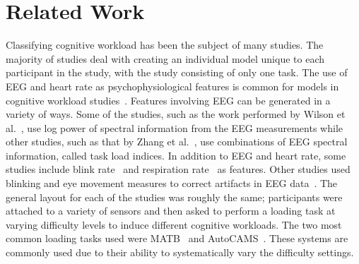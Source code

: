 \documentclass[11pt]{article}
\begin{document}
\section{Related Work}
Classifying cognitive workload has been the subject of many studies. The majority of studies deal with creating an individual model unique to each participant in the study, with the study consisting of only one task. The use of EEG and heart rate as psychophysiological features is common for models in cognitive workload studies~\cite{Wang_R, Zhang, Wilson, Yang}. Features involving EEG can be generated in a variety of ways. Some of the studies, such as the work performed by Wilson et al.~\cite{Wilson}, use log power of spectral information from the EEG measurements while other studies, such as that by Zhang et al.~\cite{Zhang}, use combinations of EEG spectral information, called task load indices. In addition to EEG and heart rate, some studies include blink rate~\cite{Wilson, Wilson_2002} and respiration rate~\cite{Wilson_2003} as features. Other studies used blinking and eye movement measures to correct artifacts in EEG data~\cite{Wang_R}. The general layout for each of the studies was roughly the same; participants were attached to a variety of sensors and then asked to perform a loading task at varying difficulty levels to induce different cognitive workloads. The two most common loading tasks used were MATB~\cite{Estepp} and AutoCAMS~\cite{Lorenz}. These systems are commonly used due to their ability to systematically vary the difficulty settings. 
\end{document}
